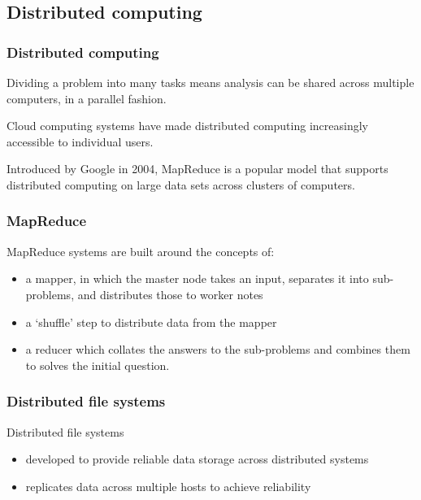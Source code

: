 \subsection{Distributed computing}\label{distributed-computing}

\subsubsection{Distributed computing}\label{distributed-computing-1}

Dividing a problem into many tasks means analysis can be shared across
multiple computers, in a parallel fashion.

Cloud computing systems have made distributed computing increasingly
accessible to individual users.

Introduced by Google in 2004, MapReduce is a popular model that supports
distributed computing on large data sets across clusters of computers.

\subsubsection{MapReduce}\label{mapreduce}

MapReduce systems are built around the concepts of:

\begin{itemize}
\itemsep1pt\parskip0pt
\item
  a mapper, in which the master node takes an input, separates it into
  sub-problems, and distributes those to worker notes
\item
  a `shuffle' step to distribute data from the mapper
\item
  a reducer which collates the answers to the sub-problems and combines
  them to solves the initial question.
\end{itemize}

\subsubsection{Distributed file systems}\label{distributed-file-systems}

Distributed file systems

\begin{itemize}
\itemsep1pt\parskip0pt
\item
  developed to provide reliable data storage across distributed systems
\item
  replicates data across multiple hosts to achieve reliability
\end{itemize}

